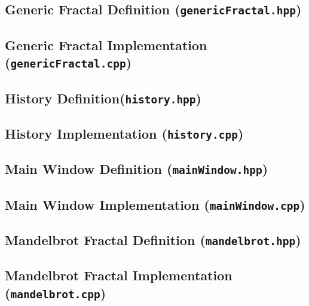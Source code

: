 \pagebreak

\subsection{Generic Fractal Definition (\texttt{genericFractal.hpp})}


\subsection{Generic Fractal Implementation (\texttt{genericFractal.cpp})}



\pagebreak

\subsection{History Definition(\texttt{history.hpp})}


\subsection{History Implementation (\texttt{history.cpp})}



\pagebreak

\subsection{Main Window Definition (\texttt{mainWindow.hpp})}


\subsection{Main Window Implementation (\texttt{mainWindow.cpp})}



\pagebreak

\subsection{Mandelbrot Fractal Definition (\texttt{mandelbrot.hpp})}


\subsection{Mandelbrot Fractal Implementation (\texttt{mandelbrot.cpp})}



